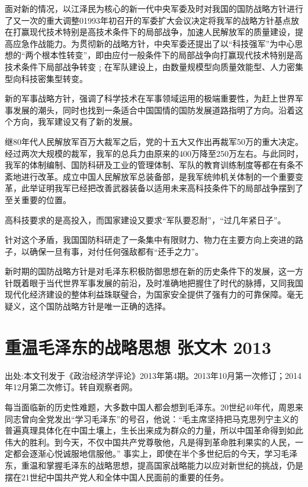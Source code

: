 \documentclass[UTF8, 12pt, a4paper]{ctexrep}
\begin{document}
面对新的情况，以江泽民为核心的新一代中央军委及时对我国的国防战略方针进行了又一次的重大调整01993年初召开的军委扩大会议决定将我军的战略方针基点放在打赢现代技术特别是高技术条件下的局部战争，加速人民解放军的质量建设，提高应急作战能力。为贯彻新的战略方针，中央军委还提出了以“科技强军”为中心思想的“两个根本性转变”，即由应付一般条件下的局部战争向打赢现代技术特别是高技术条件下局部战争转变﹔在军队建设上，由数量规模型向质量效能型、人力密集型向科技密集型转变。

新的军事战略方针，强调了科学技术在军事领域运用的极端重要性，为赶上世界军事发展的潮头，同时也找到一条适合中国国情的国防发展道路指明了方向。沿着这个方向，我军建设又有了新的发展。

继80年代人民解放军百万大裁军之后，党的十五大又作出再裁军50万的重大决定。经过两次大规模的裁军，我军的总兵力由原来的400万降至250万左右。与此同时，我军的体制编制、国防科研及工业的管理体制、军队的教育训练制度等都在有条不紊地进行改革。成立中国人民解放军总装备部，是我军统帅机关体制的一个重要变革，此举证明我军已经把改善武器装备以适用未来高科技条件下的局部战争摆到了至关重要的位置。

高科技要求的是高投入，而国家建设又要求“军队要忍耐”，“过几年紧日子”。

针对这个矛盾，我国国防科研走了一条集中有限财力、物力在主要方向上突进的路子，以确保一旦有事，对付任何强敌都有“还手之力”。

新时期的国防战略方针是对毛泽东积极防御思想在新的历史条件下的发展，这一方针既着眼于当代世界军事发展的前沿，及时准确地把握住了时代的脉搏，又同我国现代化经济建设的整体利益珠联璧合，为国家安全提供了强有力的可靠保障。毫无疑义，这个国防战略方针是唯一正确的选择。

\newpage

\chapter{重温毛泽东的战略思想 张文木 2013}

出处:本文刊发于《政治经济学评论》2013年第4期。2013年10月第一次修订；2014年12月第二次修订。转自观察者网。

\newpage

每当面临新的历史性难题，大多数中国人都会想到毛泽东。20世纪40年代，周恩来同志曾向全党发出“学习毛泽东”的号召，他说：“毛主席坚持把马克思列宁主义的普遍真理具体化在中国土壤上，生长出来成为群众的力量，所以中国革命得到如此伟大的胜利。到今天，不仅中国共产党尊敬他，凡是得到革命胜利果实的人民，一定都会逐渐心悦诚服地信服他。” 事实上，即使在半个多世纪后的今天，学习毛泽东，重温和掌握毛泽东的战略思想，提高国家战略能力以应对新世纪的挑战，仍是摆在21世纪中国共产党人和全体中国人民面前的重要的任务。
\end{document}

